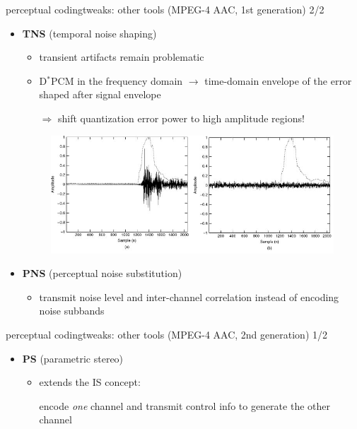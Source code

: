     \begin{frame}{perceptual coding}{tweaks: other tools (MPEG-4 AAC, 1st generation) 2/2}
		\begin{itemize}
		\item	\textbf{TNS} (temporal noise shaping)
                \begin{itemize}
                    \item   transient artifacts remain problematic
                    \item   D$^\ast$PCM in the frequency domain $\rightarrow$ time-domain envelope of the error shaped after signal envelope
                    \item[$\Rightarrow$] shift quantization error power to high amplitude regions!
                \end{itemize}
            \begin{figure}
                \includegraphics[scale=.6]{graph/tns.png}
            \end{figure}
			\pause
            \bigskip
            \item	\textbf{PNS} (perceptual noise substitution)
                \begin{itemize}
                    \item   transmit noise level and inter-channel correlation instead of encoding noise subbands
                \end{itemize}
		\end{itemize}
	\end{frame}
    \begin{frame}{perceptual coding}{tweaks: other tools (MPEG-4 AAC, 2nd generation) 1/2}
        \begin{itemize}
			\item	\textbf{PS} (parametric stereo)
                \begin{itemize}
                    \item   extends the IS concept:
                    \item[] encode \textit{one} channel and transmit control info to generate the other channel
                \end{itemize}
		\end{itemize}
	\end{frame}
